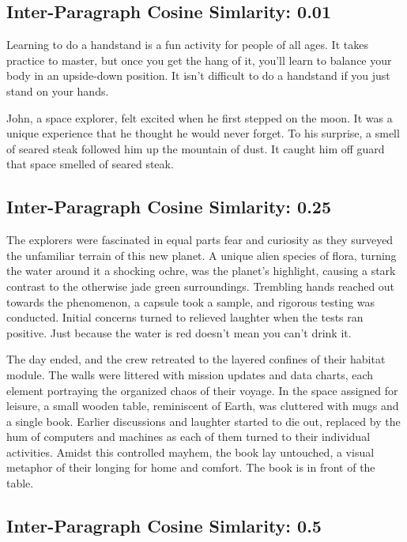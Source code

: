 \documentclass[11pt]{article}
\begin{document}
\subsection*{Inter-Paragraph Cosine Simlarity: 0.01} %

Learning to do a handstand is a fun activity for people of all ages. It takes practice to master, but once you get the hang of it, you'll learn to balance your body in an upside-down position. It isn't difficult to do a handstand if you just stand on your hands.

John, a space explorer, felt excited when he first stepped on the moon. It was a unique experience that he thought he would never forget. To his surprise, a smell of seared steak followed him up the mountain of dust. It caught him off guard that space smelled of seared steak.

\subsection*{Inter-Paragraph Cosine Simlarity: 0.25} %

The explorers were fascinated in equal parts fear and curiosity as they surveyed the unfamiliar terrain of this new planet. A unique alien species of flora, turning the water around it a shocking ochre, was the planet's highlight, causing a stark contrast to the otherwise jade green surroundings. Trembling hands reached out towards the phenomenon, a capsule took a sample, and rigorous testing was conducted. Initial concerns turned to relieved laughter when the tests ran positive. Just because the water is red doesn't mean you can't drink it.

The day ended, and the crew retreated to the layered confines of their habitat module. The walls were littered with mission updates and data charts, each element portraying the organized chaos of their voyage. In the space assigned for leisure, a small wooden table, reminiscent of Earth, was cluttered with mugs and a single book. Earlier discussions and laughter started to die out, replaced by the hum of computers and machines as each of them turned to their individual activities. Amidst this controlled mayhem, the book lay untouched, a visual metaphor of their longing for home and comfort. The book is in front of the table.

\subsection*{Inter-Paragraph Cosine Simlarity: 0.5} %
\end{document}
